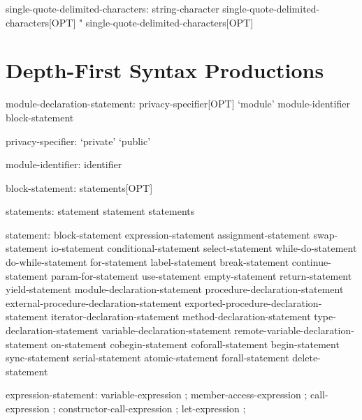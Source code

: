 \begin{syntax}
single-quote-delimited-characters:
  string-character single-quote-delimited-characters[OPT]
  " single-quote-delimited-characters[OPT]
\end{syntax}

\section{Depth-First Syntax Productions}

\begin{syntax}
module-declaration-statement:
  privacy-specifier[OPT] `module' module-identifier block-statement
\end{syntax}

\begin{syntax}
privacy-specifier:
  `private'
  `public'
\end{syntax}

\begin{syntax}
module-identifier:
  identifier
\end{syntax}

\begin{syntax}
block-statement:
  { statements[OPT] }
\end{syntax}

\begin{syntax}
statements:
  statement
  statement statements
\end{syntax}

\begin{syntax}
statement:
  block-statement
  expression-statement
  assignment-statement
  swap-statement
  io-statement
  conditional-statement
  select-statement
  while-do-statement
  do-while-statement
  for-statement
  label-statement
  break-statement
  continue-statement
  param-for-statement
  use-statement
  empty-statement
  return-statement
  yield-statement
  module-declaration-statement
  procedure-declaration-statement
  external-procedure-declaration-statement
  exported-procedure-declaration-statement
  iterator-declaration-statement
  method-declaration-statement
  type-declaration-statement
  variable-declaration-statement
  remote-variable-declaration-statement
  on-statement
  cobegin-statement
  coforall-statement
  begin-statement
  sync-statement
  serial-statement
  atomic-statement
  forall-statement
  delete-statement
\end{syntax}

\begin{syntax}
expression-statement:
  variable-expression ;
  member-access-expression ;
  call-expression ;
  constructor-call-expression ;
  let-expression ; 
\end{syntax}

